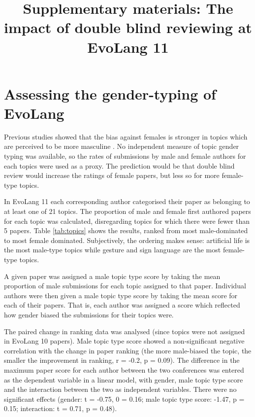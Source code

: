 \documentclass[12pt]{article}
\title{Supplementary materials: The impact of double blind reviewing at EvoLang 11}
\date{} %
\begin{document}
\maketitle

\section{Assessing the gender-typing of EvoLang}

Previous studies showed that the bias against females is stronger in topics which are perceived to be more masculine \citep{knobloch2013matilda}.  No independent measure of topic gender typing was available, so the rates of submissions by male and female authors for each topics were used as a proxy.  The prediction would be that double blind review would increase the ratings of female papers, but less so for more female-type topics.

In EvoLang 11 each corresponding author categorised their paper as belonging to at least one of 21 topics.  The proportion of male and female first authored papers for each topic was calculated, disregarding topics for which there were fewer than 5 papers.  Table \ref{tab:topics} shows the results, ranked from most male-dominated to most female dominated.   Subjectively, the ordering makes sense: artificial life is the most male-type topics while gesture and sign language are the most female-type topics.

A given paper was assigned a male topic type score by taking the mean proportion of male submissions for each topic assigned to that paper.  Individual authors were then given a male topic type score by taking the mean score for each of their papers.  That is, each author was assigned a score which reflected how gender biased the submissions for their topics were.

The paired change in ranking data was analysed (since topics were not assigned in EvoLang 10 papers).  Male topic type score showed a non-significant negative correlation with the change in paper ranking (the more male-biased the topic, the smaller the improvement in ranking, r = -0.2, p = 0.09).  The difference in the maximum paper score for each author between the two conferences was entered as the dependent variable in a linear model, with gender, male topic type score and the interaction between the two as independent variables.  There were no significant effects (gender: t = -0.75, 0 = 0.16; male topic type score: -1.47, p = 0.15; interaction: t = 0.71, p = 0.48).
\end{document}
